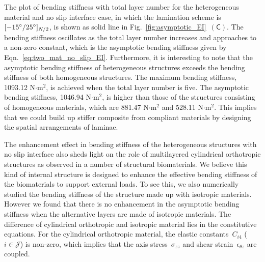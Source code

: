 \documentclass[preprint,10pt,times]{elsarticle}
\numberwithin{equation}{section}
\newcommand{\pr}[1]{\left( #1 \right)}
\newcommand{\subf}[1]{\pr{\textsf{#1}}}
\renewcommand{\>}{$\Rightarrow$}
\begin{document}
The plot of bending stiffness with total layer number for the heterogeneous material and no slip interface case, in which the lamination scheme is~$[-15 \degree/ 25 \degree]_{N/2}$, is shown as solid line in Fig.~\ref{fig:asymptotic_EI}~$\subf{C}$. The bending stiffness oscillates as the total layer number increases and approaches to a non-zero constant, which is the asymptotic bending stiffness given by Eqn.~\eqref{eq:two_mat_no_slip_EI}. Furthermore, it is interesting to note that the asymptotic bending stiffness of heterogeneous structures exceeds the bending stiffness of both homogeneous structures.
The maximum bending stiffness, 1093.12 N$\cdot$m$^2$, is achieved when the total layer number is five.
The asymptotic bending stiffness, 1046.94 N$\cdot$m$^2$, is higher than those of the structures consisting of homogeneous materials, which are 881.47 N$\cdot$m$^2$ and 528.11 N$\cdot$m$^2$. This implies that we could build up stiffer composite from compliant materials by designing the spatial arrangements of laminae.

The enhancement effect in bending stiffness of the heterogeneous structures with no slip interface also sheds light on the role of multilayered cylindrical orthotropic structures as observed in a number of structural biomaterials.
We believe this kind of internal structure is designed to enhance the effective bending stiffness of the biomaterials to support external loads. To see this, we also numerically studied the bending stiffness of the structure made up with isotropic materials. However we found that there is no enhancement in the asymptotic bending stiffness when the alternative layers are made of isotropic materials. The difference of cylindrical orthotropic and isotropic material lies in the constitutive equations. For the cylindrical orthotropic material, the elastic constants~$C_{i4}$ ($i \in \mathcal{J}$) is non-zero, which implies that the axis stress~$\sigma_{zz}$ and shear strain~$\epsilon_{\theta z}$ are coupled.
\end{document}
